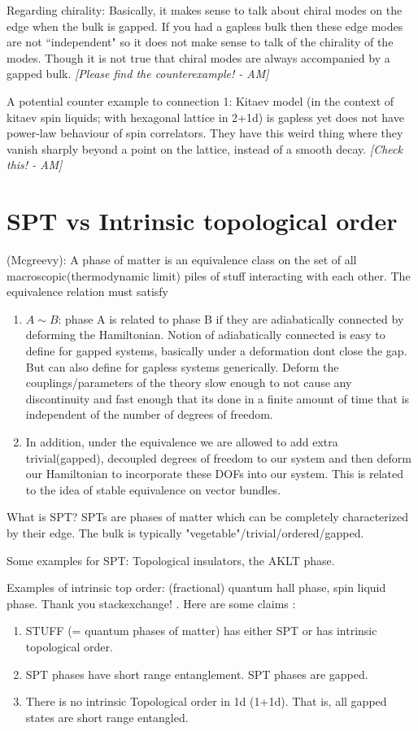 \documentclass{article}
\newcommand\AM[1]{{\it \color{darkblue}  [#1 - AM]}}
\begin{document}
Regarding chirality: Basically, it makes sense to talk about chiral modes on the edge when the bulk is gapped. If you had a gapless bulk then these edge modes are not ``independent" so it does not make sense to talk of the chirality of the modes. Though it is not true that chiral modes are always accompanied by a gapped bulk.\AM{Please find the counterexample!}

A potential counter example to connection 1: Kitaev model (in the context of kitaev spin liquids; with hexagonal lattice in 2+1d) is gapless yet does not have power-law behaviour of spin correlators. They have this weird thing where they vanish sharply beyond a point on the lattice, instead of a smooth decay.\AM{Check this!}
\section{SPT vs Intrinsic topological order}
(Mcgreevy):
A phase of matter is an equivalence class on the set of all macroscopic(thermodynamic limit) piles of stuff interacting with each other. The equivalence relation must satisfy
\begin{enumerate}
    \item $A \sim B$: phase A is related to phase B if they are adiabatically connected by deforming the Hamiltonian. Notion of adiabatically connected is easy to define for gapped systems, basically under a deformation dont close the gap. But can also define for gapless systems generically. Deform the couplings/parameters of the theory slow enough to not cause any discontinuity and fast enough that its done in a finite amount of time that is independent of the number of degrees of freedom.
    \item In addition, under the equivalence we are allowed to add extra trivial(gapped), decoupled degrees of freedom to our system and then deform our Hamiltonian to incorporate these DOFs into our system. This is related to the idea of stable equivalence on vector bundles. 
\end{enumerate}
What is SPT? SPTs are phases of matter which can be completely characterized by their edge. The bulk is typically "vegetable"/trivial/ordered/gapped.

Some examples for SPT: Topological insulators, the AKLT phase.

Examples of intrinsic top order: (fractional) quantum hall phase, spin liquid phase.
Thank you stackexchange! \cite{251464, 71160, 65897}. Here are some claims \cite{enwiki:1314883973}:
\begin{enumerate}
    \item STUFF (= quantum phases of matter) has either SPT or has intrinsic topological order.
    \item SPT phases have short range entanglement. SPT phases are gapped.
    \item There is no intrinsic Topological order in 1d (1+1d). That is, all gapped states are short range entangled.
\end{enumerate}
\end{document}
